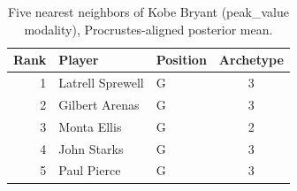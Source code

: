 \begin{table}[htbp]
  \centering\small
  \begin{tabular}{rllc}
    \toprule
    Rank & Player & Position & Archetype \\
    \midrule
    1 & Latrell Sprewell & G & 3 \\
    2 & Gilbert Arenas & G & 3 \\
    3 & Monta Ellis & G & 2 \\
    4 & John Starks & G & 3 \\
    5 & Paul Pierce & G & 3 \\
    \bottomrule
  \end{tabular}
  \caption{Five nearest neighbors of Kobe Bryant (peak_value modality), Procrustes-aligned posterior mean.}
  \label{tab:Kobe_Bryant_neighbors_peak_value}
\end{table}

